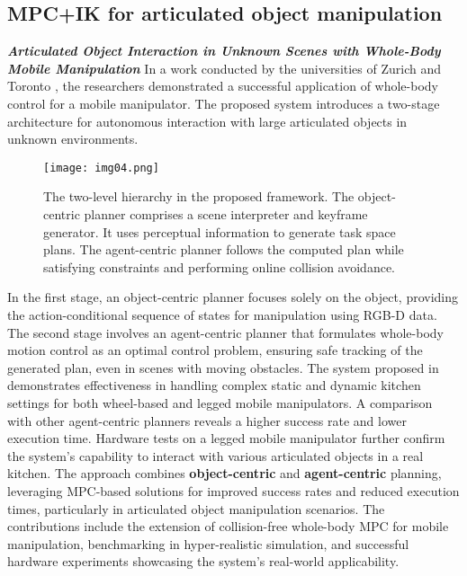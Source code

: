 \subsection{MPC+IK for articulated object manipulation}

\textbf{\textit{Articulated Object Interaction in Unknown Scenes
		with Whole-Body Mobile Manipulation}} \quad
In a work conducted by the universities of Zurich and Toronto \cite{mittal2022articulated},
the researchers demonstrated a successful application of whole-body control for a mobile
manipulator. The proposed system introduces a two-stage architecture for autonomous interaction
with large articulated objects in unknown environments.

\begin{figure}[t]
	\centering
	\texttt{[image: img04.png]}
	\captionsetup{width=0.9\linewidth}
	\caption{ The two-level hierarchy in the proposed framework. The
		object-centric planner comprises a scene interpreter and keyframe
		generator. It uses perceptual information to generate task space
		plans. The agent-centric planner follows the computed plan while
		satisfying constraints and performing online collision avoidance.
		\cite{mittal2022articulated}}
	\label{fig:img04}
\end{figure}


In the first stage, an object-centric planner focuses solely on the object, providing
the action-conditional sequence of states for manipulation using RGB-D data.
The second stage involves an agent-centric planner that formulates whole-body motion control
as an optimal control problem, ensuring safe tracking of the generated plan, even in scenes
with moving obstacles.
The system proposed in \cite{mittal2022articulated} demonstrates effectiveness in handling complex static and
dynamic kitchen settings for both wheel-based and legged mobile manipulators. A comparison with
other agent-centric planners reveals a higher success rate and lower execution time. Hardware
tests on a legged mobile manipulator further confirm the system's capability to interact with
various articulated objects in a real kitchen. The approach combines \textbf{object-centric} and
\textbf{agent-centric} planning, leveraging MPC-based solutions for improved success rates and reduced
execution times, particularly in articulated object manipulation scenarios. The contributions
include the extension of collision-free whole-body MPC for mobile manipulation, benchmarking
in hyper-realistic simulation, and successful hardware experiments showcasing the system's
real-world applicability.

